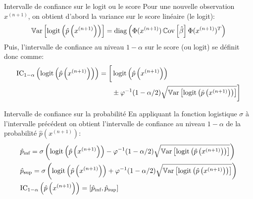 \begin{frame}{Intervalle de confiance sur le logit ou le score}
	Pour une nouvelle observation $x^{(n+1)}$, on obtient d'abord la variance sur le score linéaire (le logit):
	\begin{equation}
		\operatorname{\mathbb{V}ar}\left[\operatorname{logit}\left(\hat{p}\left(x^{(n+1)}\right)\right)\right] = \operatorname{diag}\left(\Phi(x^{(n+1)}) \operatorname{\mathbb{C}ov}\left[\hat{\beta}\right] \Phi(x^{(n+1)})^T\right)
		\nonumber
	\end{equation}
	\pause
	Puis, l'intervalle de confiance au niveau $1-\alpha$ sur le score (ou logit) se définit donc comme:
	\begin{equation}
		\begin{split}
			\text{IC}_{1-\alpha}\left(\operatorname{logit}\left(\hat{p}\left(x^{(n+1)}\right)\right)\right) = \bigg[
			&\operatorname{logit}\left(\hat{p}\left(x^{(n+1)}\right)\right) \\
			&\pm \varphi^{-1}(1 - \alpha/2) \sqrt{\operatorname{\mathbb{V}ar}\left[\operatorname{logit}\left(\hat{p}\left(x^{(n+1)}\right)\right)\right]}\bigg]			
		\end{split}
		\nonumber
	\end{equation}
\end{frame}

\begin{frame}{Intervalle de confiance sur la probabilité}
	En appliquant la fonction logistique $\sigma$ à l'intervalle précédent on obtient l'intervalle de confiance au niveau $1 - \alpha$ de la probabilité $\hat{p}(x^{(n+1)})$:
	\begin{equation}
		\begin{aligned}
			&\hat{p}_{\text{inf}} = \sigma\left(\operatorname{logit}\left(\hat{p}\left(x^{(n+1)}\right)\right) - \varphi^{-1}(1 - \alpha/2) \sqrt{\operatorname{\mathbb{V}ar}\left[\operatorname{logit}\left(\hat{p}\left(x^{(n+1)}\right)\right)\right]}\right) \\
			&\hat{p}_{\text{sup}} = \sigma\left(\operatorname{logit}\left(\hat{p}\left(x^{(n+1)}\right)\right) + \varphi^{-1}(1 - \alpha/2) \sqrt{\operatorname{\mathbb{V}ar}\left[\operatorname{logit}\left(\hat{p}\left(x^{(n+1)}\right)\right)\right]}\right) \\
			&\text{IC}_{1-\alpha}\left(\hat{p}\left(x^{(n+1)}\right)\right) = \left[\hat{p}_{\text{inf}}, \hat{p}_{\text{sup}}\right]
		\end{aligned}
		\nonumber
	\end{equation}
\end{frame}

